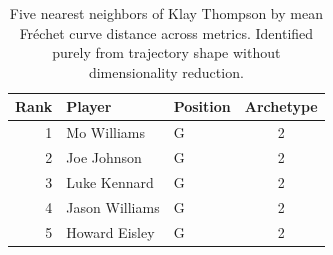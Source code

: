 \begin{table}[htbp]
  \centering\small
  \begin{tabular}{rllc}
    \toprule
    Rank & Player & Position & Archetype \\
    \midrule
    1 & Mo Williams & G & 2 \\
    2 & Joe Johnson & G & 2 \\
    3 & Luke Kennard & G & 2 \\
    4 & Jason Williams & G & 2 \\
    5 & Howard Eisley & G & 2 \\
    \bottomrule
  \end{tabular}
  \caption{Five nearest neighbors of Klay Thompson by mean Fr\'{e}chet curve distance across metrics. Identified purely from trajectory shape without dimensionality reduction.}
  \label{tab:Klay_Thompson_frechet_curve_neighbors}
\end{table}

